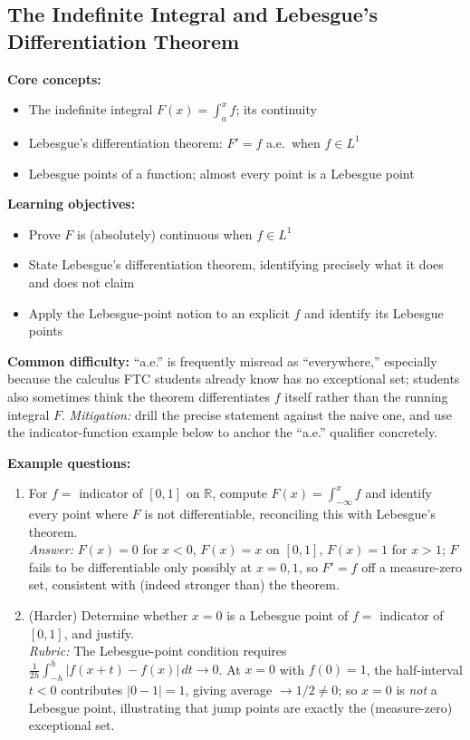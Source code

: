 \documentclass[11pt]{article}
\begin{document}
\subsection{The Indefinite Integral and Lebesgue's Differentiation Theorem}

\textbf{Core concepts:}
\begin{itemize}[nosep]
\item The indefinite integral $F(x)=\int_a^x f$; its continuity
\item Lebesgue's differentiation theorem: $F'=f$ a.e.\ when $f\in L^1$
\item Lebesgue points of a function; almost every point is a Lebesgue point
\end{itemize}

\textbf{Learning objectives:}
\begin{itemize}[nosep]
\item Prove $F$ is (absolutely) continuous when $f\in L^1$
\item State Lebesgue's differentiation theorem, identifying precisely what it does and does not claim
\item Apply the Lebesgue-point notion to an explicit $f$ and identify its Lebesgue points
\end{itemize}

\textbf{Common difficulty:} ``a.e.'' is frequently misread as ``everywhere,'' especially because the calculus FTC students already know has no exceptional set; students also sometimes think the theorem differentiates $f$ itself rather than the running integral $F$. \textit{Mitigation:} drill the precise statement against the naive one, and use the indicator-function example below to anchor the ``a.e.'' qualifier concretely.

\textbf{Example questions:}
\begin{enumerate}[nosep]
\item For $f=$ indicator of $[0,1]$ on $\mathbb{R}$, compute $F(x)=\int_{-\infty}^x f$ and identify every point where $F$ is not differentiable, reconciling this with Lebesgue's theorem. \\
\textit{Answer:} $F(x)=0$ for $x<0$, $F(x)=x$ on $[0,1]$, $F(x)=1$ for $x>1$; $F$ fails to be differentiable only possibly at $x=0,1$, so $F'=f$ off a measure-zero set, consistent with (indeed stronger than) the theorem.
\item (Harder) Determine whether $x=0$ is a Lebesgue point of $f=$ indicator of $[0,1]$, and justify. \\
\textit{Rubric:} The Lebesgue-point condition requires $\frac{1}{2h}\int_{-h}^h|f(x+t)-f(x)|\,dt\to0$. At $x=0$ with $f(0)=1$, the half-interval $t<0$ contributes $|0-1|=1$, giving average $\to1/2\ne0$; so $x=0$ is \emph{not} a Lebesgue point, illustrating that jump points are exactly the (measure-zero) exceptional set.
\end{enumerate}
\end{document}
